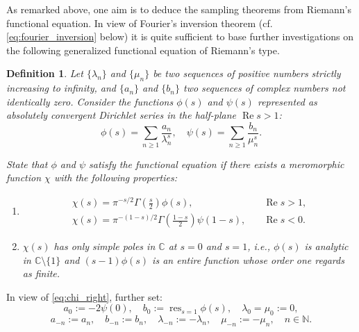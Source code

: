 \documentclass[11pt]{article}
\theoremstyle{plain}
\newtheorem{definition}[theorem]{Definition}
\begin{document}
As remarked above, one aim is to deduce the sampling theorems from Riemann's functional equation. In view of Fourier's inversion theorem (cf. \eqref{eq:fourier_inversion} below) it is quite sufficient to base further investigations on the following generalized functional equation of Riemann's type.

\begin{definition}
\label{def:riemann_functional}
Let $\{\lambda_n\}$ and $\{\mu_n\}$ be two sequences of positive numbers strictly increasing to infinity, and $\{a_n\}$ and $\{b_n\}$ two sequences of complex numbers not identically zero. Consider the functions $\phi(s)$ and $\psi(s)$ represented as absolutely convergent Dirichlet series in the half-plane $\operatorname{Re} s > 1$:
\begin{equation}
\phi(s) = \sum_{n \geq 1} \frac{a_n}{\lambda_n^s}, \quad \psi(s) = \sum_{n \geq 1} \frac{b_n}{\mu_n^s}.
\label{eq:dirichlet_series}
\end{equation}

State that $\phi$ and $\psi$ satisfy the functional equation if there exists a meromorphic function $\chi$ with the following properties:
\begin{enumerate}[label=(\roman*)]
\item 
\begin{align}
\chi(s) = \pi^{-s/2} \Gamma\left(\frac{s}{2}\right) \phi(s), & \quad \operatorname{Re} s > 1, \label{eq:chi_right}\\
\chi(s) = \pi^{-(1-s)/2} \Gamma\left(\frac{1-s}{2}\right) \psi(1-s), & \quad \operatorname{Re} s < 0. \label{eq:chi_left}
\end{align}
\item $\chi(s)$ has only simple poles in $\mathbb{C}$ at $s = 0$ and $s = 1$, i.e., $\phi(s)$ is analytic in $\mathbb{C} \setminus \{1\}$ and $(s-1)\phi(s)$ is an entire function whose order one regards as finite.
\end{enumerate}
\end{definition}

In view of \eqref{eq:chi_right}, further set:
\begin{equation}
a_0 := -2\psi(0), \quad b_0 := \operatorname{res}_{s=1} \phi(s), \quad \lambda_0 = \mu_0 := 0,
\label{eq:residue_definition}
\end{equation}
\begin{equation}
a_{-n} := a_n, \quad b_{-n} := b_n, \quad \lambda_{-n} := -\lambda_n, \quad \mu_{-n} := -\mu_n, \quad n \in \mathbb{N}.
\label{eq:symmetric_extension}
\end{equation}
\end{document}
